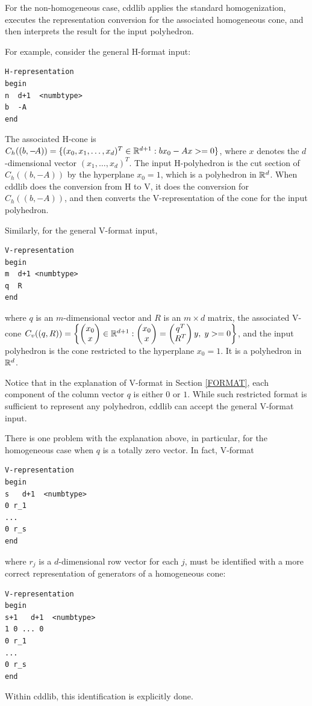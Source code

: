 \documentclass[11pt]{article}
\newcommand {\0} {{\bf 0}}
\newcommand{\R}{{\Bbb R}}
\begin{document}
For the non-homogeneous case, cddlib applies the standard homogenization,
executes the representation conversion for the associated homogeneous cone,
and then interprets the result for the input polyhedron.

For example, consider the general H-format input:
\begin{verbatim}
H-representation
begin
n  d+1  <numbtype>
b  -A
end
\end{verbatim}
The associated H-cone is $C_h((b, -\!A)) = \{ (x_0, x_1, \ldots, x_d)^T\in \R^{d+1}:  b x_0 - A x >=0 \}$,
where $x$ denotes the $d$-dimensional vector $(x_1, \ldots, x_d)^T$.
The input H-polyhedron is the cut section of $C_h((b, -\!A))$ by 
the hyperplane $x_0 =1$, which is a polyhedron in $\R^d$.  When cddlib does
the conversion from H to V, it does the conversion for $C_h((b, -\!A))$,
and then converts the V-representation of the cone for the input polyhedron.

Similarly, for the general V-format input, 
\begin{verbatim}
V-representation
begin
m  d+1 <numbtype>
q  R
end
\end{verbatim}
where $q$ is an $m$-dimensional vector and $R$ is an $m \times d$ matrix,
the associated V-cone $C_v((q, R)) = \left\{ 
\begin{pmatrix}x_0 \\ x \end{pmatrix} \in \R^{d+1}:  \begin{pmatrix}x_0 \\ x \end{pmatrix} = 
\begin{pmatrix}q^T \\ R^T\end{pmatrix}  y, \; y >=0 \right\}$,
and the input polyhedron is the cone 
restricted to the hyperplane $x_0 =1$.  It is a polyhedron in $\R^d$.

Notice that in the explanation of V-format in Section \ref{FORMAT}, each component of 
the column vector $q$ is either $0$ or $1$.  While such restricted format is sufficient to
represent any polyhedron, cddlib can accept the general V-format input.

There is one problem with the explanation above, in particular,
for the homogeneous case when $q$ is a totally zero vector.  In fact, V-format
\begin{verbatim}
V-representation
begin
s   d+1  <numbtype>
0 r_1
...
0 r_s
end
\end{verbatim}
where $r_j$ is a $d$-dimensional row vector for each $j$,
must be identified with a more correct
representation of generators of a homogeneous cone:
\begin{verbatim}
V-representation
begin
s+1   d+1  <numbtype>
1 0 ... 0
0 r_1
...
0 r_s
end
\end{verbatim}
Within cddlib, this identification is explicitly done.
\end{document}
